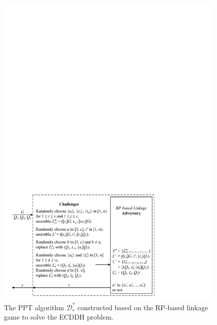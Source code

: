 \begin{figure}[tb]
  \centering
  \includegraphics[width=1.0\linewidth]{fig/rp-linkage-game.pdf}
  \caption{The PPT algorithm $\mathcal{D}^*_r$ constructed based on the RP-based linkage game to solve the ECDDH problem.}
  \label{fig:dalgorithm}
\end{figure}


